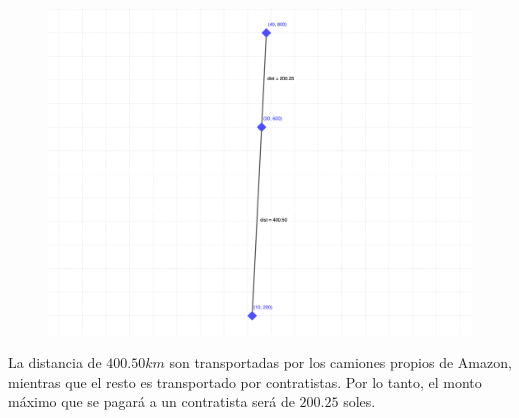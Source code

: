 \begin{figure}[h]
    \centering
    \includegraphics[scale=.13]{2024/RedDeTransporte/images/ejemplo2.png}
\end{figure}

La distancia de $400.50 km$ son transportadas por los camiones propios de Amazon, mientras que el resto es transportado por contratistas. Por lo tanto, el monto máximo que se pagará a un contratista será de $200.25$ soles.
